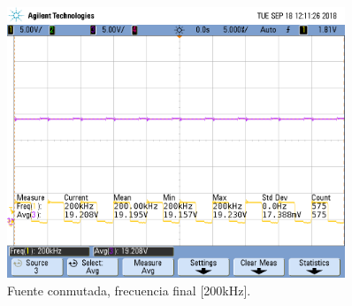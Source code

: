 \begin{figure}[H]
	\centering
	\includegraphics[width=0.9\textwidth]{Imagenes/tp3_labo5.png}
\caption{Fuente conmutada, frecuencia final [200kHz].}
	\label{fig:fcon}
\end{figure}
 
